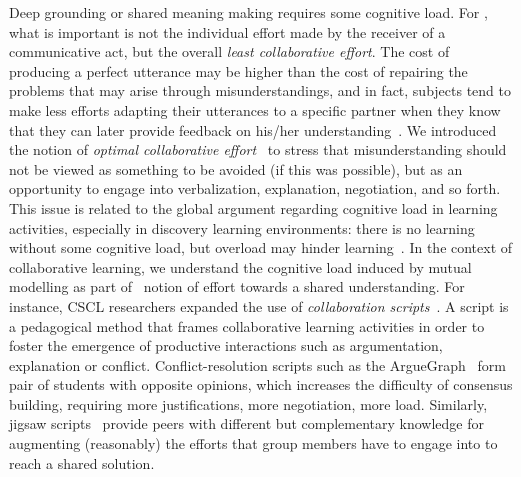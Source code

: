 \documentclass[natbib]{svjour3}
\begin{document}
Deep grounding or shared meaning making requires some cognitive load. For
\citet{clark1986referring}, what is important is not the individual effort made
by the receiver of a communicative act, but the overall \emph{least collaborative
effort}.  The cost of producing a perfect utterance may be higher than the cost
of repairing the problems that may arise through misunderstandings, and in fact,
subjects tend to make less efforts adapting their utterances to a specific
partner when they know that they can later provide feedback on his/her
understanding~\citep{schober1993spatial}. We introduced the notion of
\emph{optimal collaborative effort}~\citep{dillenbourg1995evolution} to stress
that misunderstanding should not be viewed as something to be avoided (if this
was possible), but as an opportunity to engage into verbalization, explanation,
negotiation, and so forth. This issue is related to the global argument
regarding cognitive load in learning activities, especially in discovery
learning environments: there is no learning without some cognitive load, but
overload may hinder learning~\citep{paas2003cognitive}. In the context of
collaborative learning, we understand the cognitive load induced by mutual
modelling as part of~\citet{schwartz1995emergence} notion of effort towards a
shared understanding. For instance, CSCL researchers expanded the use of
\emph{collaboration scripts}~\citep{kobbe2007specifying}. A script is a pedagogical
method that frames collaborative learning activities in order to foster the
emergence of productive interactions such as argumentation, explanation or
conflict. Conflict-resolution scripts such as the {\sc
ArgueGraph}~\citep{dillenbourg2008mechanics} form pair of students with
opposite opinions, which increases the difficulty of consensus building,
requiring more justifications, more negotiation, more load. Similarly, {\sc
jigsaw} scripts~\citep{aronson1978jigsaw} provide peers with different but
complementary knowledge for augmenting (reasonably) the efforts that group members
have to engage into to reach a shared solution. 
\end{document}
